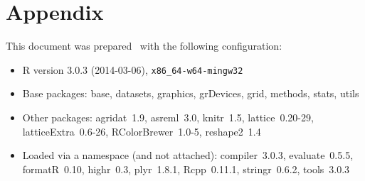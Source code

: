 \documentclass[12pt]{article}\usepackage[]{graphicx}\usepackage[]{color}
\makeatletter
\newenvironment{kframe}{%
 \def\at@end@of@kframe{}%
 \ifinner\ifhmode%
  \def\at@end@of@kframe{\end{minipage}}%
  \begin{minipage}{\columnwidth}%
 \fi\fi%
 \def\FrameCommand##1{\hskip\@totalleftmargin \hskip-\fboxsep
 \colorbox{shadecolor}{##1}\hskip-\fboxsep
     \hskip-\linewidth \hskip-\@totalleftmargin \hskip\columnwidth}%
 \MakeFramed {\advance\hsize-\width
   \@totalleftmargin\z@ \linewidth\hsize
   \@setminipage}}%
 {\par\unskip\endMakeFramed%
 \at@end@of@kframe}
\makeatother
\begin{document}

\section*{Appendix}
This document was prepared \shorttoday\ with the following configuration:
\begin{kframe}
\begin{itemize}\raggedright
  \item R version 3.0.3 (2014-03-06), \verb|x86_64-w64-mingw32|
  \item Base packages: base, datasets, graphics, grDevices, grid, methods,
    stats, utils
  \item Other packages: agridat~1.9, asreml~3.0, knitr~1.5, lattice~0.20-29,
    latticeExtra~0.6-26, RColorBrewer~1.0-5, reshape2~1.4
  \item Loaded via a namespace (and not attached): compiler~3.0.3,
    evaluate~0.5.5, formatR~0.10, highr~0.3, plyr~1.8.1, Rcpp~0.11.1,
    stringr~0.6.2, tools~3.0.3
\end{itemize}
\end{kframe}


\end{document}
